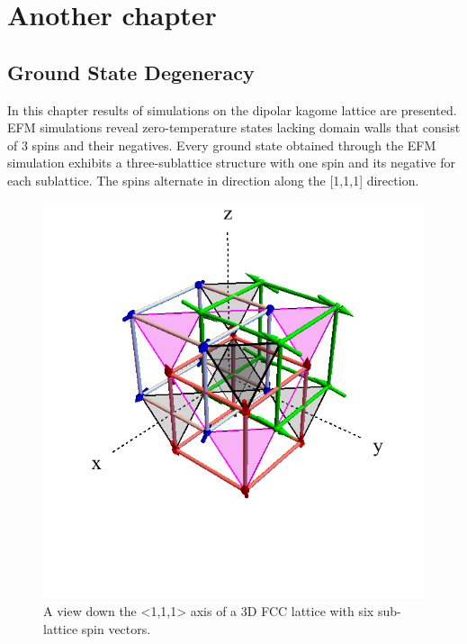 \chapter{Another chapter}\label{ch:results}

\section{Ground State Degeneracy}
In this chapter results of simulations on the dipolar kagome lattice are presented. EFM simulations reveal zero-temperature states lacking domain walls that consist of 3 spins and their negatives. Every ground state obtained through the EFM simulation exhibits a three-sublattice structure with one spin and its negative for each sublattice. The spins alternate in direction along the [1,1,1] direction. 

\begin{figure}
	\includegraphics[width=\linewidth]{img/3dfcc.png}
	\caption{A view down the <1,1,1> axis of a 3D FCC lattice with six sub-lattice spin vectors.}
	\label{fig:3dfcc}
\end{figure}

